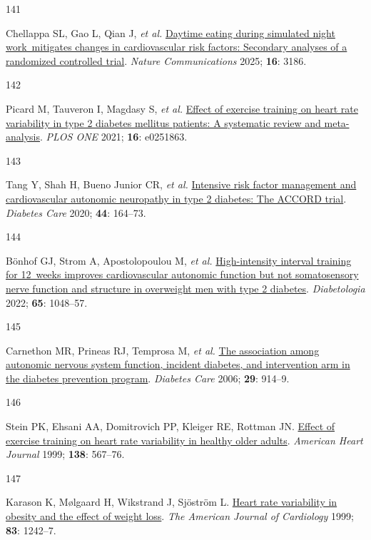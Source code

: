 \documentclass[
  a4paper,
  headsepline=true,
  open=any]{scrbook}
\newlength{\cslhangindent}
\newlength{\csllabelwidth}
\newlength{\cslentryspacingunit} %
\newenvironment{CSLReferences}[2] %
 {%
  \setlength{\parindent}{0pt}
  \ifodd #1
  \let\oldpar\par
  \def\par{\hangindent=\cslhangindent\oldpar}
  \fi
  \setlength{\parskip}{#2\cslentryspacingunit}
 }%
 {}
\newcommand{\CSLLeftMargin}[1]{\parbox[t]{\csllabelwidth}{#1}}
\newcommand{\CSLRightInline}[1]{\parbox[t]{\linewidth - \csllabelwidth}{#1}\break}
\begin{document}
\begin{CSLReferences}{0}{0}
\leavevmode{}%
\CSLLeftMargin{141 }%
\CSLRightInline{Chellappa SL, Gao L, Qian J, \emph{et al.}
\href{https://doi.org/10.1038/s41467-025-57846-y}{Daytime eating during
simulated night work~mitigates changes in cardiovascular risk factors:
Secondary analyses of a randomized controlled trial}. \emph{Nature
Communications} 2025; \textbf{16}: 3186.}

\leavevmode{}%
\CSLLeftMargin{142 }%
\CSLRightInline{Picard M, Tauveron I, Magdasy S, \emph{et al.}
\href{https://doi.org/10.1371/journal.pone.0251863}{Effect of exercise
training on heart rate variability in type 2 diabetes mellitus patients:
A systematic review and meta-analysis}. \emph{PLOS ONE} 2021;
\textbf{16}: e0251863.}

\leavevmode{}%
\CSLLeftMargin{143 }%
\CSLRightInline{Tang Y, Shah H, Bueno Junior CR, \emph{et al.}
\href{https://doi.org/10.2337/dc20-1842}{Intensive risk factor
management and cardiovascular autonomic neuropathy in type 2 diabetes:
The ACCORD trial}. \emph{Diabetes Care} 2020; \textbf{44}: 164--73.}

\leavevmode{}%
\CSLLeftMargin{144 }%
\CSLRightInline{Bönhof GJ, Strom A, Apostolopoulou M, \emph{et al.}
\href{https://doi.org/10.1007/s00125-022-05674-w}{High-intensity
interval training for 12~weeks improves cardiovascular autonomic
function but not somatosensory nerve function and structure in
overweight men with type 2 diabetes}. \emph{Diabetologia} 2022;
\textbf{65}: 1048--57.}

\leavevmode{}%
\CSLLeftMargin{145 }%
\CSLRightInline{Carnethon MR, Prineas RJ, Temprosa M, \emph{et al.}
\href{https://doi.org/10.2337/diacare.29.04.06.dc05-1729}{The
association among autonomic nervous system function, incident diabetes,
and intervention arm in the diabetes prevention program}. \emph{Diabetes
Care} 2006; \textbf{29}: 914--9.}

\leavevmode{}%
\CSLLeftMargin{146 }%
\CSLRightInline{Stein PK, Ehsani AA, Domitrovich PP, Kleiger RE, Rottman
JN. \href{https://doi.org/10.1016/S0002-8703(99)70162-6}{Effect of
exercise training on heart rate variability in healthy older adults}.
\emph{American Heart Journal} 1999; \textbf{138}: 567--76.}

\leavevmode{}%
\CSLLeftMargin{147 }%
\CSLRightInline{Karason K, Mølgaard H, Wikstrand J, Sjöström L.
\href{https://doi.org/10.1016/S0002-9149(99)00066-1}{Heart rate
variability in obesity and the effect of weight loss}. \emph{The
American Journal of Cardiology} 1999; \textbf{83}: 1242--7.}


\end{CSLReferences}
\end{document}
